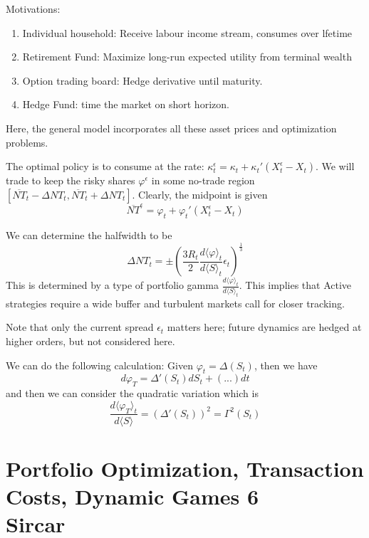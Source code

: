 Motivations:
\begin{enumerate}
	\item Individual household: Receive labour income stream, consumes over lfetime
	\item Retirement Fund: Maximize long-run expected utility from terminal wealth
	\item Option trading board: Hedge derivative until maturity.
	\item Hedge Fund: time the market on short horizon.
\end{enumerate}
Here, the general model incorporates all these asset prices and optimization problems.

The optimal policy is to consume at the rate: $\kappa_t^\epsilon = \kappa_t + \kappa_t'(X_t^\epsilon - X_t)$. We will trade to keep the risky shares $\varphi^\epsilon$ in some no-trade region $\left[\overline{NT}_t - \Delta NT_t, \overline{NT}_t + \Delta NT_t \right]$. Clearly, the midpoint is given 
\begin{equation}
	\overline{NT}^\epsilon = \varphi_t + \varphi_t'(X_t^\epsilon - X_t)
\end{equation}

We can determine the halfwidth to be
\begin{equation}
	\Delta NT_t = \pm \left(\frac{3R_t}{2} \frac{d \langle \varphi \rangle_t}{d\langle S \rangle_t}\epsilon_t \right)^{\frac{1}{3}}
\end{equation}
This is determined by a type of portfolio gamma $\frac{d \langle \varphi \rangle_t}{d\langle S \rangle_t}$. This implies that Active strategies require a wide buffer and turbulent markets call for closer tracking.

Note that only the current spread $\epsilon_t$ matters here; future dynamics are hedged at higher orders, but not considered here.

We can do the following calculation: Given $\varphi_t = \Delta(S_t)$, then we have
\begin{equation}
	d\varphi_T = \Delta'(S_t)dS_t + (...) dt
\end{equation}
and then we can consider the quadratic variation which is
\begin{equation}
	\frac{d \langle \varphi_T \rangle_t }{d \langle S \rangle} = (\Delta '(S_t))^2 = \Gamma^2(S_t)
\end{equation}


\chapter{Portfolio Optimization, Transaction Costs, Dynamic Games 6 \\ Sircar}

